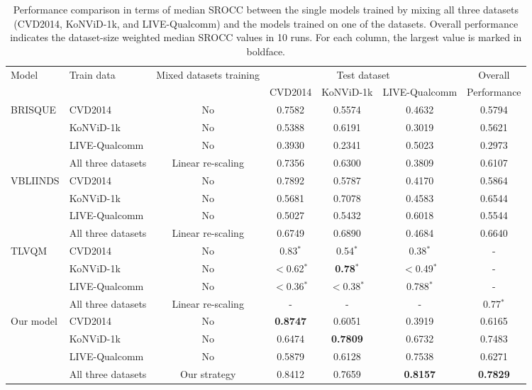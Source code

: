 \documentclass[twocolumn]{svjour3}          \smartqed  \usepackage{graphicx}
\begin{document}
\begin{table*}[!thb]
    \centering
    \caption{Performance comparison in terms of median SROCC between the single models trained by mixing all three datasets (CVD2014, KoNViD-1k, and LIVE-Qualcomm) and the models trained on one of the datasets. Overall performance indicates the dataset-size weighted median SROCC values in 10 runs. For each column, the largest value is marked in boldface.}
    \label{tab:vs individual}

    \begin{small}
    
\begin{tabular}{llccccc}
    \toprule
    \multirow{2}{*}{Model} & \multirow{2}{*}{Train data} & \multirow{2}{*}{Mixed datasets training} & \multicolumn{3}{c}{Test dataset} & Overall \\
    & & & CVD2014 & KoNViD-1k & LIVE-Qualcomm & Performance\\
    \midrule
    \multirow{4}{*}{BRISQUE} & CVD2014 & No & 0.7582 & 0.5574 & 0.4632 & 0.5794   \\
    & KoNViD-1k & No & 0.5388 & 0.6191 & 0.3019 & 0.5621   \\
    & LIVE-Qualcomm & No & 0.3930 & 0.2341 & 0.5023 & 0.2973   \\ 
    & All three datasets & Linear re-scaling & 0.7356 & 0.6300 & 0.3809 & 0.6107  \\ 
    \midrule
    \multirow{4}{*}{VBLIINDS} & CVD2014 & No &  0.7892 & 0.5787 & 0.4170 & 0.5864 \\
    & KoNViD-1k & No &  0.5681 & 0.7078 & 0.4583 & 0.6544   \\
    & LIVE-Qualcomm & No &  0.5027 & 0.5432 & 0.6018 & 0.5544   \\ 
    & All three datasets & Linear re-scaling &  0.6749 & 0.6890 & 0.4684 & 0.6640   \\ 
    \midrule
    \multirow{4}{*}{TLVQM} & CVD2014 & No &  0.83$^*$ & 0.54$^*$ & 0.38$^*$ & - \\
    & KoNViD-1k & No &  $<$0.62$^*$ & \textbf{0.78}$^*$ & $<$0.49$^*$ &  -  \\
    & LIVE-Qualcomm & No & $<$0.36$^*$ & $<$0.38$^*$ & 0.788$^*$ &  -  \\ 
    & All three datasets & Linear re-scaling &  - & - & - & 0.77$^*$   \\ 
    \midrule
    \multirow{4}{*}{Our model} & CVD2014 & No &  \textbf{0.8747} & 0.6051 & 0.3919 & 0.6165   \\
    & KoNViD-1k & No &  0.6474 & \textbf{0.7809} & 0.6732 & 0.7483   \\
    & LIVE-Qualcomm & No &  0.5879 & 0.6128 & 0.7538 & 0.6271  \\ 
    & All three datasets & Our strategy & 0.8412 & 0.7659 & \textbf{0.8157} & \textbf{0.7829}  \\ 
    \bottomrule
    \end{tabular}



\end{small}
\end{table*}
\end{document}
